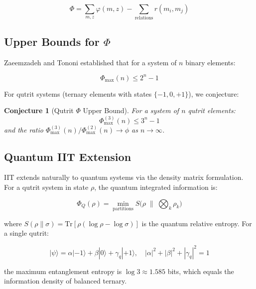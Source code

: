 \documentclass[12pt,a4paper]{article}
\newtheorem{conjecture}[theorem]{Conjecture}
\begin{document}
\begin{equation}
\Phi = \sum_{m,z} \varphi(m, z) - \sum_{\text{relations}} r(m_i, m_j)
\end{equation}

\subsection{Upper Bounds for $\Phi$}

Zaeemzadeh and Tononi \cite{Zaeemzadeh2024} established that for a system of
$n$ binary elements:

\begin{equation}
\Phi_{\max}(n) \leq 2^n - 1
\end{equation}

\noindent
For qutrit systems (ternary elements with states $\{-1, 0, +1\}$), we
conjecture:

\begin{conjecture}[Qutrit $\Phi$ Upper Bound]
For a system of $n$ qutrit elements:
\begin{equation}
\Phi_{\max}^{(3)}(n) \leq 3^n - 1
\end{equation}
and the ratio $\Phi_{\max}^{(3)}(n) / \Phi_{\max}^{(2)}(n) \to \phi$ as
$n \to \infty$.
\end{conjecture}

\subsection{Quantum IIT Extension}

IIT extends naturally to quantum systems via the density matrix formulation. For
a qutrit system in state $\rho$, the quantum integrated information is:

\begin{equation}
\Phi_Q(\rho) = \min_{\text{partitions}} S\bigl(\rho \;\|\;
\textstyle\bigotimes_k \rho_k\bigr)
\end{equation}

\noindent
where $S(\rho \| \sigma) = \mathrm{Tr}[\rho(\log\rho - \log\sigma)]$ is the
quantum relative entropy. For a single qutrit:

\begin{equation}
|\psi\rangle = \alpha|{-1}\rangle + \beta|0\rangle + \gamma_q|{+1}\rangle,
\quad |\alpha|^2 + |\beta|^2 + |\gamma_q|^2 = 1
\end{equation}

\noindent
the maximum entanglement entropy is $\log 3 \approx 1.585$ bits, which equals
the information density of balanced ternary.
\end{document}
